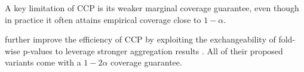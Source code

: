 \documentclass{article}
\theoremstyle{plain}
\theoremstyle{definition}
\theoremstyle{remark}
\begin{document}
A key limitation of CCP is its weaker marginal coverage guarantee, even though in practice it often attains empirical coverage close to $1-\alpha$.



\citet{gasparinimproving} further improve the efficiency of CCP by exploiting the exchangeability of fold-wise p-values to leverage stronger aggregation results \citep{Gasparin_2025_exch}. All of their proposed variants come with  a $1-2\alpha$ coverage guarantee. 

\end{document}
